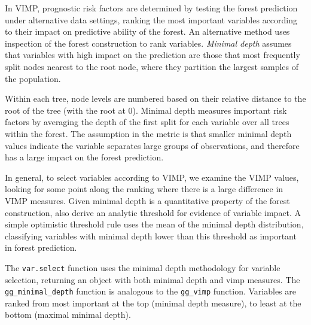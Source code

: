 \documentclass[article, nojss]{jss}
\begin{document}
In VIMP, prognostic risk factors are determined by testing the forest
prediction under alternative data settings, ranking the most important
variables according to their impact on predictive ability of the forest.
An alternative method uses inspection of the forest construction to rank
variables. \emph{Minimal depth} \citep{Ishwaran:2010, Ishwaran:2011}
assumes that variables with high impact on the prediction are those that
most frequently split nodes nearest to the root node, where they
partition the largest samples of the population.

Within each tree, node levels are numbered based on their relative
distance to the root of the tree (with the root at 0). Minimal depth
measures important risk factors by averaging the depth of the first
split for each variable over all trees within the forest. The assumption
in the metric is that smaller minimal depth values indicate the variable
separates large groups of observations, and therefore has a large impact
on the forest prediction.

In general, to select variables according to VIMP, we examine the VIMP
values, looking for some point along the ranking where there is a large
difference in VIMP measures. Given minimal depth is a quantitative
property of the forest construction, \cite{Ishwaran:2010} also derive an
analytic threshold for evidence of variable impact. A simple optimistic
threshold rule uses the mean of the minimal depth distribution,
classifying variables with minimal depth lower than this threshold as
important in forest prediction.

The  \texttt{var.select} function uses the minimal
depth methodology for variable selection, returning an object with both
minimal depth and vimp measures. The 
\texttt{gg\_minimal\_depth} function is analogous to the
\texttt{gg\_vimp} function. Variables are ranked from most important at
the top (minimal depth measure), to least at the bottom (maximal minimal
depth).
\end{document}
